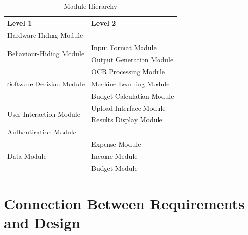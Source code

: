 \documentclass[12pt, titlepage]{article}
\begin{document}
\begin{table}[h!]
\caption{Module Hierarchy}
\centering
\begin{tabular}{p{} p{}}
\toprule
\textbf{Level 1} & \textbf{Level 2}\\
\midrule

{Hardware-Hiding Module} & ~ \\
\midrule

\multirow{2}{0.3\textwidth}{Behaviour-Hiding Module} & Input Format Module\\
& Output Generation Module\\
\midrule

\multirow{3}{0.3\textwidth}{Software Decision Module} & {OCR Processing Module}\\
& Machine Learning Module\\
& Budget Calculation Module\\
\midrule

\multirow{2}{0.3\textwidth}{User Interaction Module} & {Upload Interface Module}\\
& Results Display Module\\
\midrule


{Authentication Module} & ~ \\
\midrule

\multirow{3}{0.3\textwidth}{Data Module} & Expense Module \\
& Income Module \\
& Budget Module \\

\bottomrule

\end{tabular}\label{TblMH}
\end{table}

\newpage

\section{Connection Between Requirements and Design} \label{SecConnection}


\end{document}
